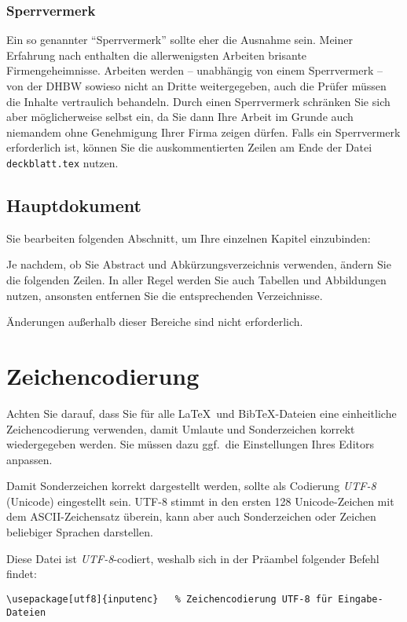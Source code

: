 \subsubsection{Sperrvermerk}
Ein so genannter \enquote{Sperrvermerk} sollte eher die Ausnahme sein. Meiner Erfahrung nach enthalten die allerwenigsten Arbeiten brisante Firmengeheimnisse. Arbeiten werden -- unabhängig von einem Sperrvermerk -- von der DHBW sowieso nicht an Dritte weitergegeben, auch die Prüfer müssen die Inhalte vertraulich behandeln. Durch einen Sperrvermerk schränken Sie sich aber möglicherweise selbst ein, da Sie dann Ihre Arbeit im Grunde auch niemandem ohne Genehmigung Ihrer Firma zeigen dürfen.
Falls ein Sperrvermerk erforderlich ist, können Sie die auskommentierten Zeilen am Ende der Datei \verb|deckblatt.tex| nutzen.

\subsection{Hauptdokument}

Sie bearbeiten folgenden Abschnitt, um Ihre einzelnen Kapitel einzubinden:
\lstset{language=}


Je nachdem, ob Sie Abstract und Abkürzungsverzeichnis verwenden, ändern Sie die folgenden Zeilen.
In aller Regel werden Sie auch Tabellen und Abbildungen nutzen, ansonsten entfernen Sie die entsprechenden Verzeichnisse. 


Änderungen außerhalb dieser Bereiche sind nicht erforderlich.

\section{Zeichencodierung}\label{section:zeichencodierung}

Achten Sie darauf, dass Sie für alle \LaTeX\ und BibTeX-Dateien eine einheitliche Zeichencodierung verwenden, damit Umlaute und Sonderzeichen korrekt wiedergegeben werden. Sie müssen dazu ggf.\ die Einstellungen Ihres Editors anpassen.

Damit Sonderzeichen korrekt dargestellt werden, sollte als Codierung \emph{UTF-8} (Unicode) eingestellt sein. UTF-8 stimmt in den ersten 128 Unicode-Zeichen mit dem ASCII-Zeichensatz überein, kann aber auch Sonderzeichen oder Zeichen beliebiger Sprachen darstellen.

Diese Datei ist \emph{UTF-8}-codiert, weshalb sich in der Präambel folgender Befehl findet:
\lstset{language=TeX} 
\begin{lstlisting}
\usepackage[utf8]{inputenc}   % Zeichencodierung UTF-8 für Eingabe-Dateien
\end{lstlisting}

